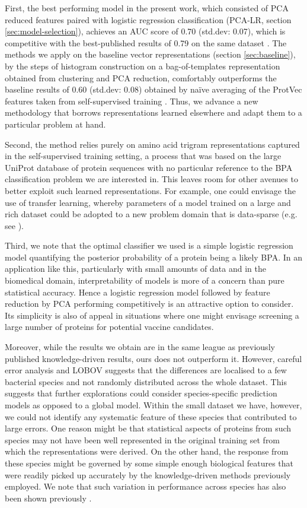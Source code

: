 \documentclass[10pt,journal,compsoc,twoside]{IEEEtran}
\begin{document}
First, the best performing model in the present work, which consisted of PCA reduced features paired with logistic regression classification (PCA-LR, section \ref{sec:model-selection}), achieves an AUC score of 0.70 (std.dev: 0.07), which is competitive with the best-published results of 0.79 on the same dataset \cite{heinson_2017,dalsass_2019}. The methods we apply on the baseline vector representations (section \ref{sec:baseline}), by the steps of histogram construction on a bag-of-templates representation obtained from clustering and PCA reduction, comfortably outperforms the baseline results of 0.60 (std.dev: 0.08) obtained by naïve averaging of the ProtVec features taken from self-supervised training \cite{protvec}. Thus, we advance a new methodology that borrows representations learned elsewhere and adapt them to a particular problem at hand.

Second, the method relies purely on amino acid trigram representations captured in the self-supervised training setting, a process that was based on the large UniProt database of protein sequences \cite{uniprot_2018} with no particular reference to the BPA classification problem we are interested in. This leaves room for other avenues to better exploit such learned representations. For example, one could envisage the use of transfer learning, whereby parameters of a model trained on a large and rich dataset could be adopted to a new problem domain that is data-sparse (e.g. see  \cite{du_transfer-learning}). 

Third, we note that the optimal classifier we used is a simple logistic regression model quantifying the posterior probability of a protein being a likely BPA. In an application like this, particularly with small amounts of data and in the biomedical domain, interpretability of models is more of a concern than pure statistical accuracy. Hence a logistic regression model followed by feature reduction by PCA performing competitively is an attractive option to consider. Its simplicity is also of appeal in situations where one might envisage screening a large number of proteins for potential vaccine candidates.

Moreover, while the results we obtain are in the same league as previously published knowledge-driven results, ours does not outperform it. However, careful error analysis and LOBOV suggests that the differences are localised to a few bacterial species and not randomly distributed across the whole dataset. This suggests that further explorations could consider species-specific prediction models as opposed to a global model. Within the small dataset we have, however, we could not identify any systematic feature of these species that contributed to large errors. One reason might be that statistical aspects of proteins from such species may not have been well represented in the original training set from which the representations were derived. On the other hand, the response from these species might be governed by some simple enough biological features that were readily picked up accurately by the knowledge-driven methods previously employed. We note that such variation in performance across species has also been shown previously \cite{heinson_2019}.
\end{document}
